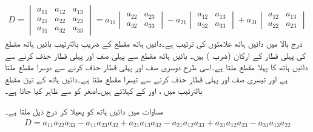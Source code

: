\begin{align}\label{مساوات_الجبرا_تین_درجی_مقطع_الف}
D=
\begin{vmatrix}
a_{11}&a_{12}&a_{13}\\
a_{21}&a_{22}&a_{23}\\
a_{31}&a_{32}&a_{33}
\end{vmatrix}
=a_{11}
\begin{vmatrix}
a_{22}&a_{23}\\
a_{32}&a_{33}
\end{vmatrix}
-a_{21}
\begin{vmatrix}
a_{12}&a_{13}\\
a_{32}&a_{33}
\end{vmatrix}
+a_{31}
\begin{vmatrix}
a_{12}&a_{13}\\
a_{22}&a_{23}
\end{vmatrix}
\end{align}
درج بالا میں دائیں ہاتھ علامتوں کی ترتیب  ہے۔دائیں ہاتھ مقطع کے  ضریب  بالترتیب بائیں ہاتھ مقطع کی پہلی قطار کے ارکان (ضرب ) ہیں۔ بائیں ہاتھ مقطع سے پہلی صف اور پہلی قطار حذف کرنے سے دائیں ہاتھ کا پہلا مقطع ملتا ہے۔اسی طرح دوسری صف اور پہلی قطار حذف کرنے سے دوسرا مقطع ملتا ہے اور تیسری صف اور پہلی قطار حذف کرنے سے تیسرا مقطع ملتا ہے۔دائیں ہاتھ کے تین مقطع بالترتیب  میں ،  اور  کے  کہلاتے ہیں۔اصغر کو  سے ظاہر کیا جاتا ہے۔

مساوات  میں دائیں ہاتھ  کو پھیلا کر درج ذیل ملتا ہے۔
\begin{align}\label{مساوات_الجبرا_تین_درجی_مقطع_ب}
D=a_{11}a_{22}a_{33}-a_{11}a_{23}a_{32}+a_{21}a_{13}a_{32}-a_{21}a_{12}a_{33}+a_{31}a_{12}a_{23}-a_{31}a_{13}a_{22}
\end{align}


